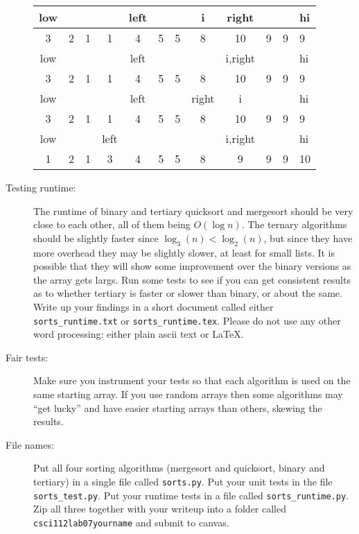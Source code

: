 \documentclass{article}
\begin{document}
\begin{description}
\begin{tabular}{|c|c|c|c|c|c|c|c|c|c|c|l|}
     low&        &        &        &    left&        &        &       i&   right&        &        &      hi\\\hline
       3&       2&       1&       1&       4&       5&       5&       8&      10&       9&       9&       9\\\hline\hline
     low&        &        &        &    left&        &        &        & i,right&        &        &      hi\\\hline
       3&       2&       1&       1&       4&       5&       5&       8&      10&       9&       9&       9\\\hline\hline
     low&        &        &        &    left&        &        &   right&       i&        &        &      hi\\\hline
       3&       2&       1&       1&       4&       5&       5&       8&      10&       9&       9&       9\\\hline\hline
     low&        &        &    left&        &        &        &        & i,right&        &        &      hi\\\hline
       1&       2&       1&       3&       4&       5&       5&       8&       9&       9&       9&      10\\\hline
\end{tabular}

\item[Testing runtime:]  The runtime of binary and tertiary quicksort and mergesort should
be very close to each other, all of them being $O(\log n)$.  The ternary algorithms
should be slightly faster since $\log_3(n) < \log_2(n)$, but since they have more
overhead they may be slightly slower, at least for small lists.
It is possible that they will show some improvement over the binary versions
as the array gets largs.  Run some tests to see if you can get consistent results
as to whether tertiary is faster or slower than binary, or about the same.  Write up
your findings in a short document called either \lstinline{sorts_runtime.txt} or
\lstinline{sorts_runtime.tex}.  Please do not use any other word processing:
either plain ascii text or \LaTeX.

\item[Fair tests:] Make sure you instrument your tests so that each algorithm
is used on the same starting array.  If you use random arrays then some algorithms
may ``get lucky'' and have easier starting arrays than others, skewing the results.

\item[File names:]  Put all four sorting algorithms (mergesort and quicksort, binary and
tertiary) in a single file called \verb|sorts.py|.  Put your unit tests in the file \verb|sorts_test.py|.
Put your runtime tests in a file called \verb|sorts_runtime.py|.  Zip all three together with 
your writeup into a folder
called \verb|csci112lab07yourname| and submit to canvas.

\end{description}
\end{document}
